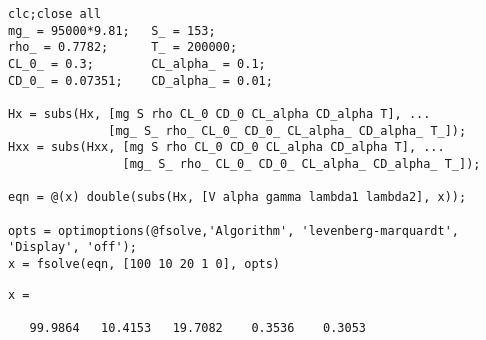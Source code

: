 \documentclass[12pt]{article}
\begin{document}
\begin{verbatim}
clc;close all
mg_ = 95000*9.81;   S_ = 153;
rho_ = 0.7782;      T_ = 200000;
CL_0_ = 0.3;        CL_alpha_ = 0.1;
CD_0_ = 0.07351;    CD_alpha_ = 0.01;

Hx = subs(Hx, [mg S rho CL_0 CD_0 CL_alpha CD_alpha T], ...
              [mg_ S_ rho_ CL_0_ CD_0_ CL_alpha_ CD_alpha_ T_]);
Hxx = subs(Hxx, [mg S rho CL_0 CD_0 CL_alpha CD_alpha T], ...
                [mg_ S_ rho_ CL_0_ CD_0_ CL_alpha_ CD_alpha_ T_]);

eqn = @(x) double(subs(Hx, [V alpha gamma lambda1 lambda2], x));

opts = optimoptions(@fsolve,'Algorithm', 'levenberg-marquardt', 'Display', 'off');
x = fsolve(eqn, [100 10 20 1 0], opts)
\end{verbatim}

        \color{lightgray} \begin{verbatim}
x =

   99.9864   10.4153   19.7082    0.3536    0.3053
\end{verbatim} \color{black}



\end{document}
